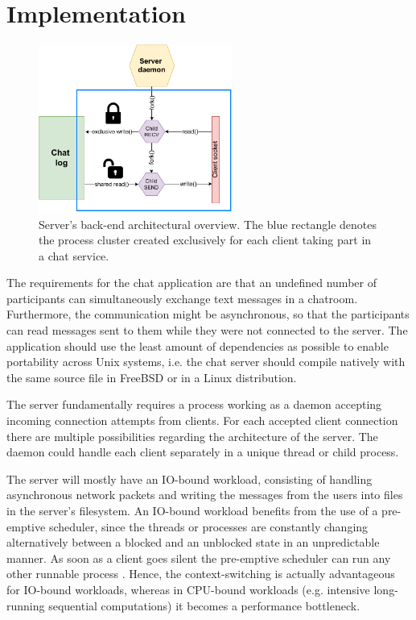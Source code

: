 \section{Implementation}
\begin{figure}[!t]
	\centering
	\includegraphics[width=2.5in]{img/server.pdf}
	\caption{Server's back-end architectural overview. The blue rectangle denotes the process cluster created exclusively for each client taking part in a chat service.}
	\label{fig_server_backend}
\end{figure}
The requirements for the chat application are that an undefined number of participants can simultaneously exchange text messages in a chatroom. Furthermore, the communication might be asynchronous, so that the participants can read messages sent to them while they were not connected to the server. The application should use the least amount of dependencies as possible to enable portability across Unix systems, i.e. the chat server should compile natively with the same source file in FreeBSD or in a Linux distribution.

The server fundamentally requires a process working as a daemon accepting incoming connection attempts from clients. For each accepted client connection there are multiple possibilities regarding the architecture of the server. The daemon could handle each client separately in a unique thread or child process.

The server will mostly have an IO-bound workload, consisting of handling asynchronous network packets and writing the messages from the users into files in the server's filesystem. An IO-bound workload benefits from the use of a pre-emptive scheduler, since the threads or processes are constantly changing alternatively between a blocked and an unblocked state in an unpredictable manner. As soon as a client goes silent the pre-emptive scheduler can run any other runnable process \cite{Kennedy2018}. Hence, the context-switching is actually advantageous for IO-bound workloads, whereas in CPU-bound workloads (e.g. intensive long-running sequential computations) it becomes a performance bottleneck.

